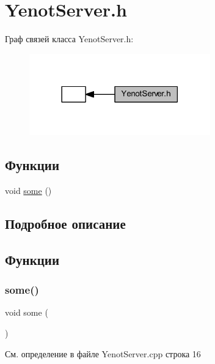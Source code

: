 \hypertarget{group__serveryenotserverh}{}\section{Yenot\+Server.\+h}
\label{group__serveryenotserverh}
Граф связей класса Yenot\+Server.\+h\+:
\nopagebreak
\begin{figure}[H]
\begin{center}
\leavevmode
\includegraphics[width=222pt]{group__serveryenotserverh}
\end{center}
\end{figure}
\subsection*{Функции}
\begin{DoxyCompactItemize}
\item 
void \mbox{\hyperlink{group__serveryenotserverh_ga3bf507bc2b43ea8ed45bdfeaf8d11171}{some}} ()
\end{DoxyCompactItemize}


\subsection{Подробное описание}


\subsection{Функции}
\mbox{\label{group__serveryenotserverh_ga3bf507bc2b43ea8ed45bdfeaf8d11171}} 
\subsubsection{\texorpdfstring{some()}{some()}}
{\footnotesize\ttfamily void some (\begin{DoxyParamCaption}{ }\end{DoxyParamCaption})}



См. определение в файле Yenot\+Server.\+cpp строка 16

